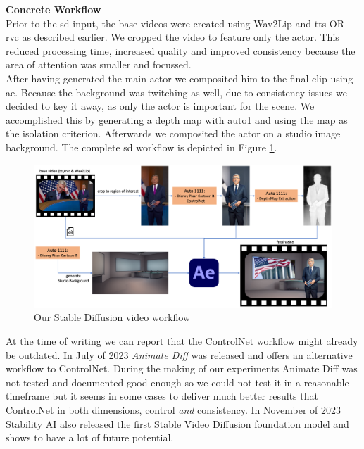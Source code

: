 \documentclass[
  a4paper,  %
  twoside,  %
  bibliography=totoc,
  headsepline,
  cleardoublepage=empty,
  parskip=half,
  draft=false
]{scrbook}
\begin{document}

\textbf{Concrete Workflow} \\
Prior to the \gls{sd} input, the base videos were created using Wav2Lip and \gls{tts} OR \gls{rvc} as described earlier. We cropped the video to feature only the actor. This reduced processing time, increased quality and improved consistency because the area of attention was smaller and focussed. \\
After having generated the main actor we composited him to the final clip using \gls{ae}. Because the background was  twitching as well, due to consistency issues we decided to key it away, as only the actor is important for the scene. We accomplished this by generating a depth map with \gls{auto1} and using the map as the isolation criterion. Afterwards we composited the actor on a studio image background. The complete \gls{sd} workflow is depicted in Figure \ref{fig:sd-full-workflow}. 

\begin{figure}[h]
  \centering
  \includegraphics[width=1\textwidth]{./graphics/images/diffusion/sd-workflow.png}
  \caption{Our Stable Diffusion video workflow}
  \label{fig:sd-full-workflow}
\end{figure}

At the time of writing we can report that the ControlNet workflow might already be outdated. In July of 2023 \textit{Animate Diff} was released and offers an alternative workflow to ControlNet. During the making of our experiments Animate Diff was not tested and documented good enough so we could not test it in a reasonable timeframe but it seems in some cases to deliver much better results that ControlNet in both dimensions, control \textit{and} consistency. In November of 2023 Stability AI also released the first Stable Video Diffusion foundation model and shows to have a lot of future potential. 
\end{document}
